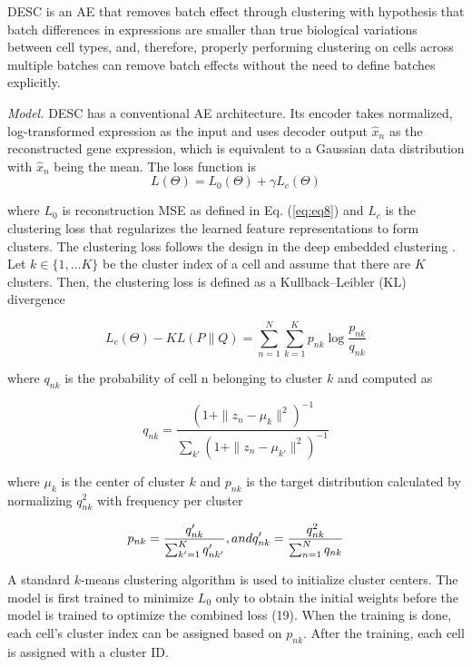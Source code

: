 \documentclass[
]{book}
\begin{document}
DESC \citep{RN88} is an AE that removes batch effect through clustering with hypothesis that batch differences in expressions are smaller than true biological variations between cell types, and, therefore, properly performing clustering on cells across multiple batches can remove batch effects without the need to define batches explicitly.

\emph{Model.} DESC has a conventional AE architecture. Its encoder takes normalized, log-transformed expression as the input and uses decoder output \(\hat{x}_{n}\) as the reconstructed gene expression, which is equivalent to a Gaussian data distribution with \(\hat{x}_{n}\) being the mean. The loss function is
\begin{equation}
  L(\Theta) = L_{0}(\Theta)+\gamma L_{c}(\Theta) \label{eq:eq19}
\end{equation}

where \(L_{0}\) is reconstruction MSE as defined in Eq. (\eqref{eq:eq8}) and \(L_{c}\) is the clustering loss that regularizes the learned feature representations to form clusters. The clustering loss follows the design in the deep embedded clustering \citep{RN119} . Let \(k \in \{1,…K\}\) be the cluster index of a cell and assume that there are \(K\) clusters. Then, the clustering loss is defined as a Kullback--Leibler (KL) divergence

\begin{equation}
L_{c}(\Theta) - KL(P\|Q)  = \sum_{n=1}^{N} \sum_{k=1}^{K}p_{nk}\log{\frac{p_{nk}}{q_{nk}}} \label{eq:eq20}
\end{equation}

where \(q_{nk}\) is the probability of cell n belonging to cluster \(k\) and computed as

\begin{equation}
q_{nk} = \frac{ (1+\|z_{n}-\mu_{k}\|^{2})^{-1}}{\sum_{k'}(1+\|z_{n}-\mu_{k'}\|^{2})^{-1}} \label{eq:eq21}
\end{equation}

where \(μ_{k}\) is the center of cluster \(k\) and \(p_{nk}\) is the target distribution calculated by normalizing \(q_{nk}^{2}\) with frequency per cluster

\begin{equation}
p_{nk}=\frac{q'_{nk}}{\sum_{k'=1}^{K}q'_{nk'}}, \space and \space q'_{nk}=\frac{q_{nk}^{2}}{\sum_{n=1}^{N}q_{nk}} \label{eq:eq22}
\end{equation}

A standard \(k\)-means clustering algorithm is used to initialize cluster centers. The model is first trained to minimize \(L_{0}\) only to obtain the initial weights before the model is trained to optimize the combined loss (19). When the training is done, each cell's cluster index can be assigned based on \(p_{nk}\). After the training, each cell is assigned with a cluster ID.
\end{document}
